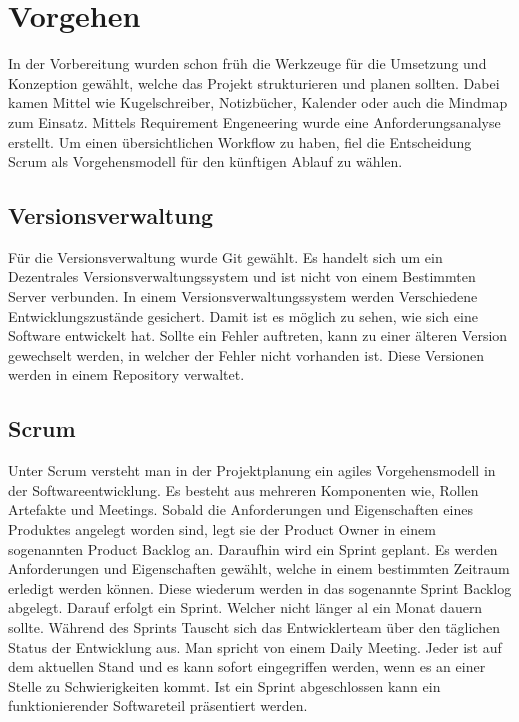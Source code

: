 \chapter{Vorgehen}
In der Vorbereitung wurden schon früh die Werkzeuge für die Umsetzung und Konzeption gewählt, welche das Projekt strukturieren und planen sollten. Dabei kamen Mittel wie Kugelschreiber, Notizbücher, Kalender oder auch die Mindmap zum Einsatz. Mittels Requirement Engeneering wurde eine Anforderungsanalyse erstellt. Um einen übersichtlichen Workflow zu haben, fiel die Entscheidung Scrum als Vorgehensmodell für den künftigen Ablauf zu wählen.

\section{Versionsverwaltung}
Für die Versionsverwaltung wurde Git gewählt. Es handelt sich um ein Dezentrales Versionsverwaltungssystem und ist nicht von einem Bestimmten Server verbunden. In einem Versionsverwaltungssystem werden Verschiedene Entwicklungszustände gesichert. Damit ist es möglich zu sehen, wie sich eine Software entwickelt hat. Sollte ein Fehler auftreten, kann zu einer älteren Version gewechselt werden, in welcher der Fehler nicht vorhanden ist. Diese Versionen werden in einem Repository verwaltet.\autocite{git}



\section{Scrum}
\label{scrum}

Unter Scrum versteht man in der Projektplanung ein agiles Vorgehensmodell in der Softwareentwicklung. Es besteht aus mehreren Komponenten wie, Rollen Artefakte und Meetings. Sobald die Anforderungen und Eigenschaften eines Produktes angelegt worden sind, legt sie der Product Owner in einem sogenannten Product Backlog an. Daraufhin wird ein Sprint geplant. Es werden Anforderungen und Eigenschaften gewählt, welche in einem bestimmten Zeitraum erledigt werden können. Diese wiederum werden in das sogenannte Sprint Backlog abgelegt. Darauf erfolgt ein Sprint. Welcher nicht länger al ein Monat dauern sollte. Während des Sprints Tauscht sich das Entwicklerteam über den täglichen Status der Entwicklung aus. Man spricht von einem Daily Meeting. Jeder ist auf dem aktuellen Stand und es kann sofort eingegriffen werden, wenn es an einer Stelle zu Schwierigkeiten kommt. Ist ein Sprint abgeschlossen kann ein funktionierender Softwareteil präsentiert werden. \autocite{Niermann.2017}

